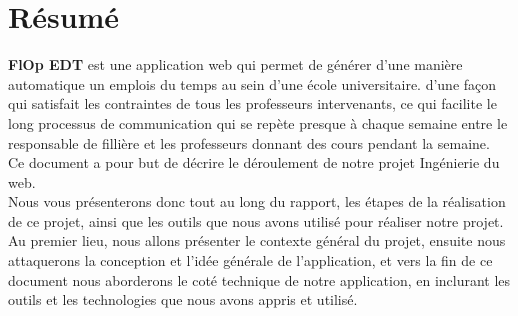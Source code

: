 \chapter*{Résumé}

\noindent \textbf{FlOp EDT} est une application web qui permet de générer d'une manière automatique un emplois du temps au sein d'une école universitaire. d'une façon qui satisfait les contraintes de tous les professeurs intervenants, ce qui facilite le long processus de communication qui se repète presque à chaque semaine entre le responsable de fillière et les professeurs donnant des cours pendant la semaine.\\

Ce document a pour but de décrire le déroulement de notre projet Ingénierie du web.\\

Nous vous présenterons donc tout au long du rapport, les étapes de la réalisation de ce projet, ainsi que les outils que nous avons utilisé pour réaliser notre projet.\\

Au premier lieu, nous allons présenter le contexte général du projet, ensuite nous attaquerons la conception et l'idée générale de l'application, et vers la fin de ce document nous aborderons le coté technique de notre application, en inclurant les outils et les technologies que nous avons appris et utilisé.
\newpage




